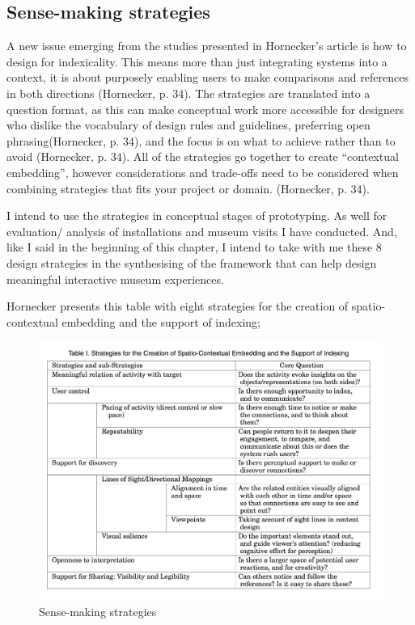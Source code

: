 \subsection{Sense-making strategies}
A new issue emerging from the studies presented in Hornecker’s article is how to design for indexicality. This means more than just integrating systems into a context, it is about purposely enabling users to make comparisons and references in both directions (Hornecker, p. 34). The strategies are translated into a question format, as this can make conceptual work more accessible for designers who dislike the vocabulary of design rules and guidelines, preferring open phrasing(Hornecker, p. 34), and the focus is on what to achieve rather than to avoid (Hornecker, p. 34). All of the strategies go together to create “contextual embedding”, however considerations and trade-offs need to be considered when combining strategies that fits your project or domain. (Hornecker, p. 34).

I intend to use the strategies in conceptual stages of prototyping. As well for evaluation/ analysis of installations and museum visits I have conducted. And, like I said in the beginning of this chapter, I intend to take with me these 8 design strategies in the synthesising of the framework that can help design meaningful interactive museum experiences. 

Hornecker presents this table with eight strategies for the creation of spatio-contextual embedding and the support of indexing;

\begin{figure}[H]
\centering 
\includegraphics[width=12.5cm]{pictures/strategies.png}
\caption{Sense-making strategies}
\end{figure}